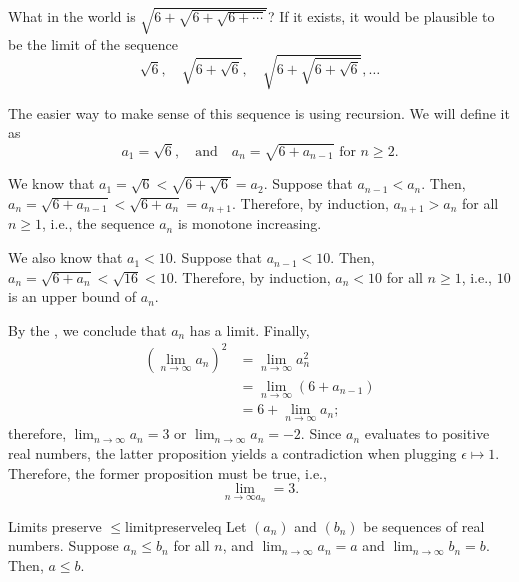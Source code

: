 \begin{exmp}{}{}
	What in the world is \(\sqrt{6 + \sqrt{6 + \sqrt{6 + \cdots}}}\)? If it exists, it would be plausible to be the limit of the sequence  \[
		\sqrt{6}, \quad \sqrt{6+\sqrt{6}}, \quad \sqrt{6 + \sqrt{6 + \sqrt{6}}}, \dots
	\]

	The easier way to make sense of this sequence is using recursion. We will define it as \[
		a_1 = \sqrt{6}, \quad \text{and} \quad a_n = \sqrt{6+a_{n-1}} \text{ for } n \geq 2.
	\]

	We know that \(a_1 = \sqrt{6} < \sqrt{6 + \sqrt{6}} = a_2\). Suppose that \(a_{n-1} < a_n\). Then, \(a_n = \sqrt{6 + a_{n-1}} < \sqrt{6 + a_n} = a_{n+1}\). Therefore, by induction,  \(a_{n+1} > a_n\) for all \(n \geq 1\), i.e., the sequence \(a_n\) is monotone increasing. 

	We also know that \(a_1 < 10\). Suppose that \(a_{n-1} < 10\). Then, \(a_n = \sqrt{6 + a_n} < \sqrt{16} < 10\). Therefore, by induction,  \(a_n < 10\) for all  \(n \geq 1\), i.e., \(10\) is an upper bound of \(a_n\).

	By the , we conclude that \(a_n\) has a limit. Finally, \begin{align*}
		\left(\lim_{n \to \infty} a_n\right)^2 &= \lim_{n\to\infty} a_n^2 \\
											   &= \lim_{n\to\infty} \left(6 + a_{n-1}\right) \\
											   &= 6 + \lim_{n\to\infty} a_n;
	\end{align*}
	therefore, \(\lim_{n\to\infty}a_n = 3\) or  \(\lim_{n\to\infty}a_n = -2\). Since \(a_n\) evaluates to positive real numbers, the latter proposition yields a contradiction when plugging \(\epsilon \mapsto 1\). Therefore, the former proposition must be true, i.e.,  \[
		\lim_{n\to\infty a_n} = 3.
	\]
\end{exmp}

\begin{thm}{Limits preserve \(\leq\)}{limitpreserveleq}
	Let \((a_n)\) and \((b_n)\) be sequences of real numbers.
	Suppose \(a_n \leq b_n\) for all \(n\), and \(\lim_{n\to\infty} a_n = a\) and \(\lim_{n\to\infty} b_n = b\). Then, \(a \leq b\).
\end{thm}
